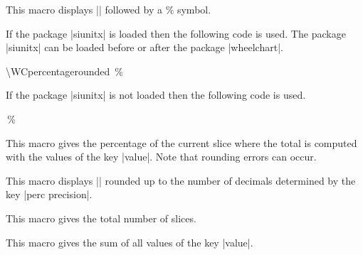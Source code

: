 \documentclass[a4paper,english,dvipsnames]{ltxdoc}
\begin{document}
\begin{command}{\WCperc}
This macro displays |\WCpercentagerounded| followed by a \unit{\percent} symbol.

If the package |siunitx| is loaded then the following code is used. The package |siunitx| can be loaded before or after the package |wheelchart|.
\begin{codeexample}
\qty{\WCpercentagerounded}{\percent}
\end{codeexample}
If the package |siunitx| is not loaded then the following code is used.
\begin{codeexample}
\WCpercentagerounded\,\%
\end{codeexample}
\end{command}
\begin{command}{\WCpercentage}
This macro gives the percentage of the current slice where the total is computed with the values of the key |value|. Note that rounding errors can occur.
\begin{codeexample}[width=10cm,preamble={\usepackage{siunitx}}]
\begin{tikzpicture}
\wheelchart[
    data=\WCvarC\\\WCperc,
    slices style={
        \WCvarB!\fpeval{4*\WCpercentage}
    }
]{\exampleforthismanual}
\end{tikzpicture}
\end{codeexample}
\end{command}
\begin{command}{\WCpercentagerounded}
This macro displays |\WCpercentage| rounded up to the number of decimals determined by the key |perc precision|.
\end{command}
\begin{command}{\WCtotalcount}
This macro gives the total number of slices.
\end{command}
\begin{command}{\WCtotalnum}
This macro gives the sum of all values of the key |value|.
\begin{codeexample}[width=10cm]
\begin{tikzpicture}
\wheelchart[
    data=\WCvarC: \WCvarA,
    middle={%
        \textbf{\huge Fruit}\\%
        \WCtotalcount{} species\\%
        \WCtotalnum{} pieces%
    }
]{\exampleforthismanual}
\end{tikzpicture}
\end{codeexample}
\end{command}
\end{document}
